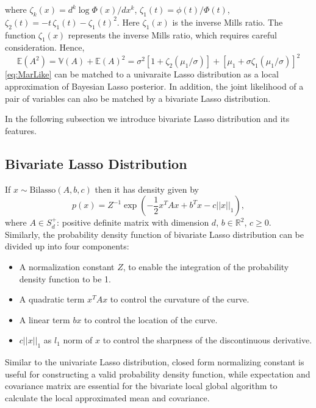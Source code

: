 \noindent where $\zeta_k(x) = d^k \log \Phi(x)/dx^k$,
$\zeta_1(t) = \phi(t)/\Phi(t)$, $\zeta_2(t) = -t\,\zeta_1(t) - \zeta_1(t)^2$.
Here
$\zeta_1(x)$ is the inverse Mills ratio. The function $\zeta_1(x)$ represents the inverse Mills ratio, which requires careful consideration. 
Hence,
$$
\mathbb{E}(A^2) = \mathbb{V}(A) + \mathbb{E}(A)^2 = \sigma^2  \left[ 1 + \zeta_2(\mu_1/\sigma) \right] + \left[\mu_1 + \sigma \zeta_1(\mu_1/\sigma) \right]^2
$$
\autoref{eq:MarLike} can be matched to a univaraite Lasso distribution as a local approximation of Bayesian Lasso posterior. In addition, the joint likelihood of a pair of variables can also be matched by a bivariate Lasso distribution.\

\noindent In the following subsection we introduce bivariate Lasso distribution and its features.

\subsection{Bivariate Lasso Distribution}
\label{bilasso}
If $x \sim \mbox{Bilasso}(A,b,c)$ then it has density given by
\begin{equation}
	p(x) = Z^{-1}\exp\left(-\frac{1}{2}x^TAx+b^Tx-c||x||_1\right),
\end{equation}
 where $A \in S_d^+$: positive definite matrix with dimension $d$, $b \in \mathbb{R}^2$, $c \geq 0$.\\

Similarly, the probability density function of bivariate Lasso distribution can be divided up into four components:
\begin{itemize}
	\item A normalization constant $Z$, to enable the integration of the probability density function to be 1.
	\item A quadratic term $x^TAx$ to control the curvature of the curve.
	\item A linear term $bx$ to control the location of the curve.
	\item $c||x||_1$ as $l_1$ norm of $x$ to control the sharpness of the discontinuous derivative.
\end{itemize} 
Similar to the univariate Lasso distribution, closed form normalizing constant is useful for constructing a valid probability density function, while expectation and covariance matrix are essential for the bivariate local global algorithm to calculate the local approximated mean and covariance.\\
 
